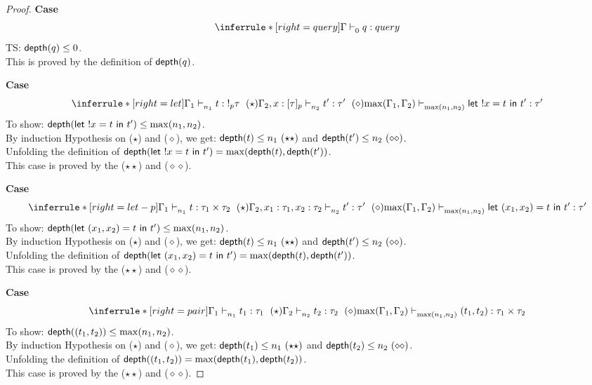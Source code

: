\documentclass{article}
\begin{document}
\begin{proof}
    \noindent \textbf{Case}
 \[
 \inferrule*[right = query]
   {\empty}
   {\Gamma \jtype{0}{}{q}{query}  }
   \]
TS: $\mathsf{depth}(q) \leq 0$.\\
This is proved by the definition of $\mathsf{depth}(q)$.

 \noindent \textbf{Case} 
   \[
   \inferrule*[ right = let ]
   {\Gamma_1 \jtype{n_1}{}{t}{!_p \tau} ~ (\star) \\ \Gamma_2, x: [\tau]_p \jtype{n_2}{}{t'}{\tau'}  ~ (\diamond)}
   { \max(\Gamma_1,\Gamma_2) \jtype{\max(n_1,n_2)}{}{\letx{!x}{t}{t'}}{\tau'}  }
   \]
   To show: $\mathsf{depth}(\mathrel{ \mathsf{let}\ {!x} = {t} \ \mathsf{in} \ {t'} }) \leq \max(n_1,n_2)$.\\
     By induction Hypothesis on ($\star$) and ($\diamond$), we get:
   $\depth(t) \leq n_1~(\star\star)$ and $\mathsf{depth}(t') \leq n_2 ~ (\diamond\diamond)$.\\
   Unfolding the definition of $\mathsf{depth}(\mathrel{ \mathsf{let}\ {!x} = {t} \ \mathsf{in} \ {t'} }) = \max(\mathsf{depth}(t), \mathsf{depth}(t'))$.\\
   This case is proved by the ($\star\star$) and ($\diamond\diamond$).
   
 \noindent \textbf{Case} 
   \[   
   \inferrule*[ right = let-p ]
   {\Gamma_1 \jtype{n_1}{}{t}{\tau_1 \times \tau_2 } ~ (\star)  \\ \Gamma_2, x_1: \tau_1, x_2 : \tau_2 \jtype{n_2}{}{t'}{\tau'}  ~ (\diamond)}
   { \max(\Gamma_1,\Gamma_2)  \jtype{\max(n_1,n_2)}{}{ \letx{(x_1,x_2)}{t}{t'} }{\tau'}  }
    \]
     To show: $\mathsf{depth}(\mathrel{ \mathsf{let}\ {(x_1, x_2)} = {t} \ \mathsf{in} \ {t'} }) \leq \max(n_1,n_2)$.\\
     By induction Hypothesis on ($\star$) and ($\diamond$), we get:
   $\depth(t) \leq n_1~(\star\star)$ and $\mathsf{depth}(t') \leq n_2 ~ (\diamond\diamond)$.\\
   Unfolding the definition of $\mathsf{depth}(\mathrel{ \mathsf{let}\ {(x_1, x_2)} = {t} \ \mathsf{in} \ {t'} }) = \max(\mathsf{depth}(t), \mathsf{depth}(t'))$.\\
   This case is proved by the ($\star\star$) and ($\diamond\diamond$).
 
 \noindent \textbf{Case} 
   \[
     \inferrule*[right = pair]
   {\Gamma_1 \jtype{n_1}{}{t_1}{\tau_1} ~ (\star)  \\ \Gamma_2 \jtype{n_2}{}{t_2}{\tau_2} ~ (\diamond)}
   { \max(\Gamma_1,\Gamma_2)  \jtype{\max(n_1,n_2)}{}{(t_1, t_2)}{\tau_1 \times \tau_2}  }
    \]
    To show: $\mathsf{depth}((t_1, t_2)) \leq \max(n_1,n_2)$.\\
    By induction Hypothesis on ($\star$) and ($\diamond$), we get:
    $\depth(t_1) \leq n_1~(\star\star)$ and $\mathsf{depth}(t_2) \leq n_2 ~ (\diamond\diamond)$.\\
    Unfolding the definition of $\mathsf{depth}((t_1, t_2)) = \max(\mathsf{depth}(t_1), \mathsf{depth}(t_2))$.\\
    This case is proved by the ($\star\star$) and ($\diamond\diamond$).
 

\end{proof}
\end{document}
